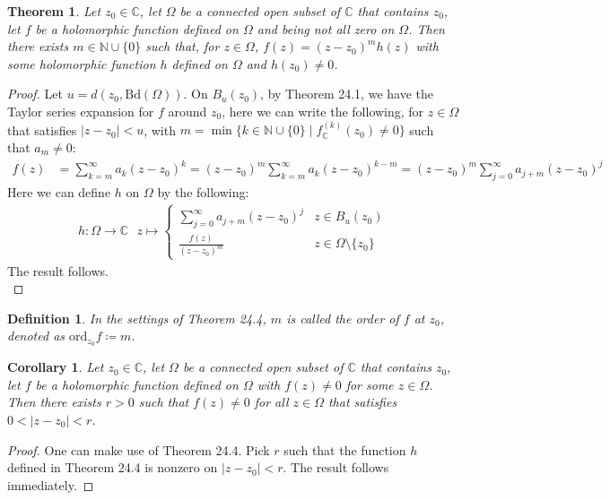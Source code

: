 \documentclass[15pt]{book}
\theoremstyle{break}
\theoremstyle{break}
\newtheorem{thm}{Theorem}[section]
\newtheorem{corT}[lem]{Corollary}
\newtheorem{defn}{Definition}[corL]
\newcommand{\N}{\mathbb{N}}
\newcommand{\Bd}{\text{Bd}}
\newcommand{\Complex}{\mathbb{C}}
\begin{document}
\begin{thm}
Let $z_0 \in \Complex$, let $\Omega$ be a connected open subset of $\Complex$ that contains $z_0$, let $f$ be a holomorphic function defined on $\Omega$ and being not all zero on $\Omega$. Then there exists $m \in \N\cup\{0\}$ such that, for $z \in \Omega$, $f(z) = (z-z_0)^m h(z)$ with some holomorphic function $h$ defined on $\Omega$ and $h(z_0) \neq 0$. 
\end{thm}
\begin{proof}
Let $u = d(z_0, \Bd(\Omega))$. On $B_u (z_0)$, by Theorem 24.1, we have the Taylor series expansion for $f$ around $z_0$, here we can write the following, for $z \in \Omega$ that satisfies $|z-z_0|<u$, with $m=\min\{ k \in \N \cup \{0\} \mid f^{(k)}_\Complex(z_0 ) \neq 0 \}$ such that $a_m \neq 0$:
\begin{align*}
f(z) &= \sum_{k=m}^\infty a_k (z-z_0)^k
= (z-z_0)^m \sum_{k=m}^\infty a_k (z-z_0)^{k-m}
= (z-z_0)^m \sum_{j=0}^\infty a_{j+m} (z-z_0)^{j}
\end{align*}
Here we can define $h$ on $\Omega$ by the following:
\begin{align*}
h:\Omega \to \Complex \ \ \ z\mapsto \begin{cases}
\sum_{j=0}^\infty a_{j+m} (z-z_0)^{j} & z \in B_u (z_0)\\
\frac{f(z)}{(z-z_0)^m} & z \in \Omega\setminus \{z_0\}
\end{cases}
\end{align*}
The result follows.\\
\end{proof}

\begin{defn}
In the settings of Theorem 24.4, $m$ is called the order of $f$ at $z_0$, denoted as $\text{ord}_{z_0}f \coloneqq m$.
\end{defn}


\begin{corT}
Let $z_0 \in \Complex$, let $\Omega$ be a connected open subset of $\Complex$ that contains $z_0$, let $f$ be a holomorphic function defined on $\Omega$ with $f(z) \neq 0$ for some $z \in \Omega$. Then there exists $r>0$ such that $f(z) \neq 0$ for all $z \in \Omega$ that satisfies $0<|z-z_0|<r$. 
\end{corT}
\begin{proof}
One can make use of Theorem 24.4. Pick $r$ such that the function $h$ defined in Theorem 24.4 is nonzero on $|z-z_0|<r$. The result follows immediately.
\end{proof}
\end{document}
